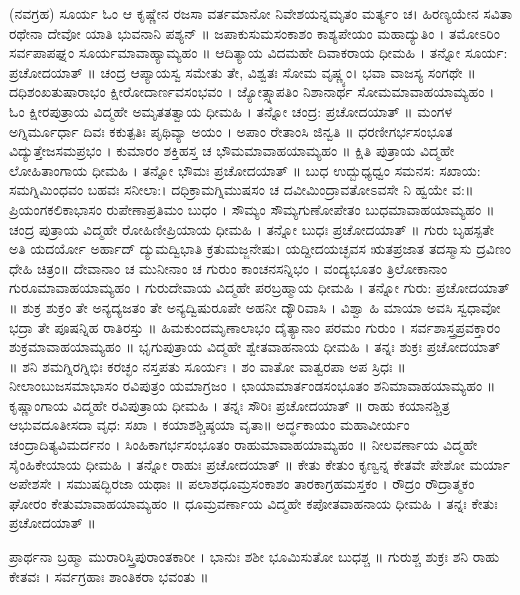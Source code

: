(ನವಗ್ರಹ)
ಸೂರ್ಯ 
ಓಂ ಆ ಕೃಷ್ಣೇನ ರಜಸಾ ವರ್ತಮಾನೋ ನಿವೇಶಯನ್ನಮೃತಂ ಮರ್ತ್ಯಂ ಚ। ಹಿರಣ್ಯಯೇನ ಸವಿತಾ ರಥೇನಾ ದೇವೋ ಯಾತಿ ಭುವನಾನಿ ಪಶ್ಯನ್ ॥
ಜಪಾಕುಸುಮಸಂಕಾಶಂ ಕಾಶ್ಯಪೇಯಂ ಮಹಾದ್ಯುತಿಂ । ತಮೋಽರಿಂ ಸರ್ವಪಾಪಘ್ನಂ ಸೂರ್ಯಮಾವಾಹ್ಯಾಮ್ಯಹಂ ॥
ಆದಿತ್ಯಾಯ ವಿದಮಹೇ ದಿವಾಕರಾಯ ಧೀಮಹಿ । ತನ್ನೋ ಸೂರ್ಯ: ಪ್ರಚೋದಯಾತ್ ॥
ಚಂದ್ರ
ಆಪ್ಯಾಯಸ್ವ ಸಮೇತು ತೇ, ವಿಶ್ವತಃ ಸೋಮ ವೃಷ್ಣ್ಯಂ। ಭವಾ ವಾಜಸ್ಯ ಸಂಗಥೇ ॥
ದಧಿಶಂಖತುಷಾರಾಭಂ ಕ್ಷೀರೋದಾರ್ಣವಸಂಭವಂ । ಜ್ಯೋತ್ಸ್ನಾಪತಿಂ ನಿಶಾನಾರ್ಥ ಸೋಮಮಾವಾಹಯಾಮ್ಯಹಂ ।
ಓಂ ಕ್ಷೀರಪುತ್ರಾಯ ವಿದ್ಮಹೇ ಅಮೃತತತ್ವಾಯ ಧೀಮಹಿ । ತನ್ನೋ ಚಂದ್ರ: ಪ್ರಚೋದಯಾತ್ ॥
ಮಂಗಳ
ಅಗ್ನಿರ್ಮೂರ್ಧಾ ದಿವಃ ಕಕುತ್ಪತಿಃ ಪೃಥಿವ್ಯಾ ಅಯಂ । ಅಪಾಂ ರೇತಾಂಸಿ ಜಿನ್ವತಿ ॥
ಧರಣೀಗರ್ಭಸಂಭೂತ ವಿದ್ಯುತ್ತೇಜಸಮಪ್ರಭಂ । ಕುಮಾರಂ ಶಕ್ತಿಹಸ್ತ ಚ ಭೌಮಮಾವಾಹಯಾಮ್ಯಹಂ ॥
ಕ್ಷಿತಿ ಪುತ್ರಾಯ ವಿದ್ಮಹೇ ಲೋಹಿತಾಂಗಾಯ ಧೀಮಹಿ । ತನ್ನೋ ಭೌಮಃ ಪ್ರಚೋದಯಾತ್ ॥
ಬುಧ
ಉದ್ಬುಧ್ಯಧ್ವಂ ಸಮನಸ: ಸಖಾಯ: ಸಮಗ್ನಿಮಿಂಧವಂ ಬಹವಃ ಸನೀಲಾ:। ದಧಿಕ್ರಾಮಗ್ನಿಮುಷಸಂ ಚ ದವೀಮಿಂದ್ರಾವತೋಽವಸೇ ನಿ ಹ್ವಯೇ ವ:॥
ಪ್ರಿಯಂಗಕಲಿಕಾಭಾಸಂ ರುಪೇಣಾಪ್ರತಿಮಂ ಬುಧಂ । ಸೌಮ್ಯಂ ಸೌಮ್ಯಗುಣೋಪೇತಂ ಬುಧಮಾವಾಹಯಾಮ್ಯಹಂ ॥
ಚಂದ್ರ ಪುತ್ರಾಯ ವಿದ್ಮಹೇ ರೋಹಿಣೀಪ್ರಿಯಾಯ ಧೀಮಹಿ । ತನ್ನೋ ಬುಧಃ ಪ್ರಚೋದಯಾತ್ ॥
ಗುರು
ಬೃಹಸ್ಪತೇ ಅತಿ ಯದರ್ಯೋ ಅರ್ಹಾದ್ ದ್ಯುಮದ್ವಿಭಾತಿ ಕ್ರತುಮಜ್ಜನೇಷು। ಯದ್ದೀದಯಚ್ಛವಸ ಋತಪ್ರಜಾತ ತದಸ್ಮಾಸು ದ್ರವಿಣಂ ಧೇಹಿ ಚಿತ್ರಂ॥
ದೇವಾನಾಂ ಚ ಮುನೀನಾಂ ಚ ಗುರುಂ ಕಾಂಚನಸನ್ನಿಭಂ । ವಂದ್ಯಭೂತಂ ತ್ರಿಲೋಕಾನಾಂ ಗುರೂಮಾವಾಹಯಾಮ್ಯಹಂ ।
ಗುರುದೇವಾಯ ವಿದ್ಮಹೇ ಪರಬ್ರಹ್ಮಾಯ ಧೀಮಹಿ । ತನ್ನೋ ಗುರು: ಪ್ರಚೋದಯಾತ್ ॥
ಶುಕ್ರ
ಶುಕ್ರಂ ತೇ ಅನ್ಯದ್ಯಜತಂ ತೇ ಅನ್ಯದ್ವಿಷುರೂಪೇ ಅಹನೀ ದ್ಯೌರಿವಾಸಿ । ವಿಶ್ವಾ ಹಿ ಮಾಯಾ ಅವಸಿ ಸ್ವಧಾವೋ ಭದ್ರಾ ತೇ ಪೂಷನ್ನಿಹ ರಾತಿರಸ್ತು ॥
ಹಿಮಕುಂದಮೃಣಾಲಾಭಂ ದೈತ್ಯಾನಾಂ ಪರಮಂ ಗುರುಂ । ಸರ್ವಶಾಸ್ತ್ರಪ್ರವಕ್ತಾರಂ ಶುಕ್ರಮಾವಾಹಯಾಮ್ಯಹಂ ॥
ಭೃಗುಪುತ್ರಾಯ ವಿದ್ಮಹೇ ಶ್ವೇತವಾಹನಾಯ ಧೀಮಹಿ । ತನ್ನಃ ಶುಕ್ರಃ ಪ್ರಚೋದಯಾತ್ ॥
ಶನಿ
ಶಮಗ್ನಿರಗ್ನಿಭಿಃ ಕರಚ್ಛಂ ನಸ್ತಪತು ಸೂರ್ಯಃ । ಶಂ ವಾತೋ ವಾತ್ವರಪಾ ಅಪ ಸ್ರಿಧಃ ॥
ನೀಲಾಂಬುಜಸಮಾಭಾಸಂ ರವಿಪುತ್ರಂ ಯಮಾಗ್ರಜಂ । ಛಾಯಾಮಾರ್ತಂಡಸಂಭೂತಂ ಶನಿಮಾವಾಹಯಾಮ್ಯಹಂ ॥
ಕೃಷ್ಣಾಂಗಾಯ ವಿದ್ಮಹೇ ರವಿಪುತ್ರಾಯ ಧೀಮಹಿ । ತನ್ನಃ ಸೌರಿಃ ಪ್ರಚೋದಯಾತ್ ॥
ರಾಹು
ಕಯಾನಶ್ಚಿತ್ರ ಆಭುವದೂತೀಸದಾ ವೃಧ: ಸಖಾ । ಕಯಾಶಶ್ಚಿಷ್ಠಯಾ ವೃತಾ॥
ಅರ್ದ್ಧಕಾಯಂ ಮಹಾವೀರ್ಯಂ ಚಂದ್ರಾದಿತ್ಯವಿಮರ್ದನಂ । ಸಿಂಹಿಕಾಗರ್ಭಸಂಭೂತಂ ರಾಹುಮಾವಾಹಯಾಮ್ಯಹಂ ॥
ನೀಲವರ್ಣಾಯ ವಿದ್ಮಹೇ ಸೈಂಹಿಕೇಯಾಯ ಧೀಮಹಿ । ತನ್ನೋ ರಾಹುಃ ಪ್ರಚೋದಯಾತ್ ॥
ಕೇತು
ಕೇತುಂ ಕೃಣ್ವನ್ನ ಕೇತವೇ ಪೇಶೋ ಮರ್ಯಾ ಅಪೇಶಸೇ । ಸಮುಷದ್ಭಿರಜಾ ಯಥಾಃ ॥
ಪಲಾಶಧೂಮ್ರಸಂಕಾಶಂ ತಾರಕಾಗ್ರಹಮಸ್ತಕಂ । ರೌದ್ರಂ ರೌದ್ರಾತ್ಮಕಂ ಘೋರಂ ಕೇತುಮಾವಾಹಯಾಮ್ಯಹಂ ॥
ಧೂಮ್ರವರ್ಣಾಯ ವಿದ್ಮಹೇ ಕಪೋತವಾಹನಾಯ ಧೀಮಹಿ । ತನ್ನಃ ಕೇತುಃ ಪ್ರಚೋದಯಾತ್ ॥

ಪ್ರಾರ್ಥನಾ
ಬ್ರಹ್ಮಾ ಮುರಾರಿಸ್ತ್ರಿಪುರಾಂತಕಾರೀ ।
ಭಾನುಃ ಶಶೀ ಭೂಮಿಸುತೋ ಬುಧಶ್ಚ ॥
ಗುರುಶ್ಚ ಶುಕ್ರಃ ಶನಿ ರಾಹು ಕೇತವಃ ।
ಸರ್ವಗ್ರಹಾಃ ಶಾಂತಿಕರಾ ಭವಂತು ॥



